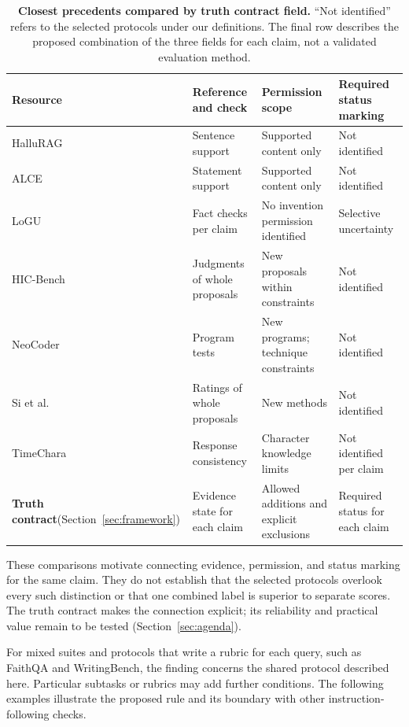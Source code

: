 \documentclass{clv2025}
\begin{document}
\begin{table}[!ht]
\centering\small
\caption{\textbf{Closest precedents compared by truth contract field.}
``Not identified'' refers to the selected protocols under our definitions.
The final row describes the proposed combination of the three fields for
each claim, not a validated evaluation method.}
\label{tab:precedents}
\begin{tabularx}{\linewidth}{@{}P{.17\linewidth}YYY@{}}
\toprule
\textbf{Resource} & \textbf{Reference and check} & \textbf{Permission scope} & \textbf{Required status marking}\\\midrule
HalluRAG & Sentence support & Supported content only & Not identified\\\addlinespace[4pt]
ALCE & Statement support & Supported content only & Not identified\\\addlinespace[4pt]
LoGU & Fact checks per claim & No invention permission identified & Selective uncertainty\\\addlinespace[4pt]
HIC-Bench & Judgments of whole proposals & New proposals within constraints & Not identified\\\addlinespace[4pt]
NeoCoder & Program tests & New programs; technique constraints & Not identified\\\addlinespace[4pt]
Si et al. & Ratings of whole proposals & New methods & Not identified\\\addlinespace[4pt]
TimeChara & Response consistency & Character knowledge limits & Not identified per claim\\\midrule
{}
\textbf{Truth contract}\newline(Section~\ref{sec:framework}) & Evidence state for each claim & Allowed additions and explicit exclusions & Required status for each claim\\
\bottomrule
\end{tabularx}


\end{table}

These comparisons motivate connecting evidence, permission, and status
marking for the same claim. They do not establish that the selected
protocols overlook every such distinction or that one combined label is
superior to separate scores. The truth contract makes the connection
explicit; its reliability and practical value remain to be tested
(Section~\ref{sec:agenda}).

For mixed suites and protocols that write a rubric for each query, such
as FaithQA and WritingBench, the finding concerns the shared protocol
described here. Particular subtasks or rubrics may add further conditions.
The following examples illustrate the proposed rule and its boundary
with other instruction-following checks.
\end{document}
